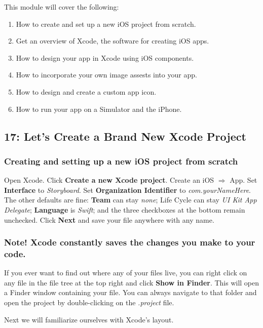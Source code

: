 \documentclass[12pt, letterpaper]{article}
\begin{document}
This module will cover the following:
\begin{enumerate}
    \itemsep0em
    \item{How to create and set up a new iOS project from scratch.}
    \item{Get an overview of Xcode, the software for creating iOS apps.}
    \item{How to design your app in Xcode using iOS components.}
    \item{How to incorporate your own image assests into your app.}
    \item{How to design and create a custom app icon.}
    \item{How to run your app on a Simulator and the iPhone.}
\end{enumerate}

\subsection*{17: Let's Create a Brand New Xcode Project}

\subsubsection*{Creating and setting up a new iOS project from scratch}

Open Xcode. Click \textbf{Create a new Xcode project}. Create an iOS $\Rightarrow$ App. 
Set \textbf{Interface} to \emph{Storyboard}. Set \textbf{Organization Identifier} to 
\emph{com.yourNameHere}. The other defaults are fine: \textbf{Team} can stay \emph{none}; Life Cycle can stay
\emph{UI Kit App Delegate}; \textbf{Language} is \emph{Swift}; and the three checkboxes at the
bottom remain unchecked. Click \textbf{Next} and save your file anywhere with any name. \\

\subsubsection*{Note! Xcode constantly saves the changes you make to your code.}

If you ever want to find out where any of your files live, you can right click on any file in the 
file tree at the top right and click \textbf{Show in Finder}. This will open a Finder window 
containing your file. You can always navigate to that folder and open the project by double-clicking
on the \emph{.project} file.

Next we will familiarize ourselves with Xcode's layout.
\end{document}
